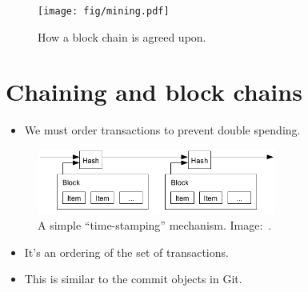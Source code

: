 \begin{frame}
  \begin{figure}
    \texttt{[image: fig/mining.pdf]}
    \caption{How a block chain is agreed upon.}
  \end{figure}
\end{frame}



\section[Chaining]{Chaining and block chains}

\begin{frame}
  \begin{remark}
    \begin{itemize}
      \item We must order transactions to prevent double spending.
    \end{itemize}
  \end{remark}
\end{frame}

\begin{frame}
  \begin{figure}
    \includegraphics[width=0.7\textwidth]{fig/bitcoin-stamp.png}
    \caption{A simple \enquote{time-stamping} mechanism.
    Image:~\cite{Nakamoto2008bap}.}
  \end{figure}

  \pause

  \begin{remark}
    \begin{itemize}
      \item It's an ordering of the set of transactions.
      \item This is similar to the commit objects in Git.
    \end{itemize}
  \end{remark}
\end{frame}

